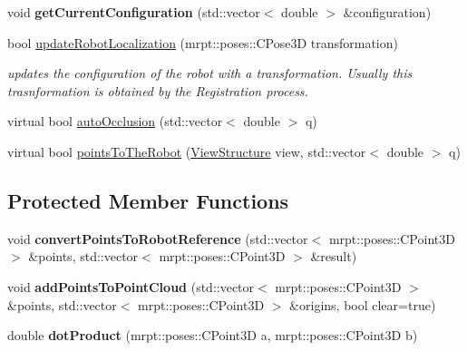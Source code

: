 \begin{DoxyCompactItemize}
\item 
void {\bfseries get\+Current\+Configuration} (std\+::vector$<$ double $>$ \&configuration)\hypertarget{classRobotSensor_a4b7a23f169416d68ca709305bab109c9}{}\label{classRobotSensor_a4b7a23f169416d68ca709305bab109c9}

\item 
bool \hyperlink{classRobotSensor_a8cfdb150fb9a8add2df06009c258e139}{update\+Robot\+Localization} (mrpt\+::poses\+::\+C\+Pose3D transformation)\hypertarget{classRobotSensor_a8cfdb150fb9a8add2df06009c258e139}{}\label{classRobotSensor_a8cfdb150fb9a8add2df06009c258e139}

\begin{DoxyCompactList}\small\item\em updates the configuration of the robot with a transformation. Usually this trasnformation is obtained by the Registration process. \end{DoxyCompactList}\item 
virtual bool \hyperlink{classRobotSensor_a8e1c363f54f6e5a00499b93fd245a3da}{auto\+Occlusion} (std\+::vector$<$ double $>$ q)
\item 
virtual bool \hyperlink{classRobotSensor_a720b3046a49b028d07090c1c79cd0a96}{points\+To\+The\+Robot} (\hyperlink{classViewStructure}{View\+Structure} view, std\+::vector$<$ double $>$ q)
\end{DoxyCompactItemize}
\subsection*{Protected Member Functions}
\begin{DoxyCompactItemize}
\item 
void {\bfseries convert\+Points\+To\+Robot\+Reference} (std\+::vector$<$ mrpt\+::poses\+::\+C\+Point3D $>$ \&points, std\+::vector$<$ mrpt\+::poses\+::\+C\+Point3D $>$ \&result)\hypertarget{classRobotSensor_a5c36e17b54e0f4c06cd3b47e8976c924}{}\label{classRobotSensor_a5c36e17b54e0f4c06cd3b47e8976c924}

\item 
void {\bfseries add\+Points\+To\+Point\+Cloud} (std\+::vector$<$ mrpt\+::poses\+::\+C\+Point3D $>$ \&points, std\+::vector$<$ mrpt\+::poses\+::\+C\+Point3D $>$ \&origins, bool clear=true)\hypertarget{classRobotSensor_a317e3af77772a792ac4672f0461d2da8}{}\label{classRobotSensor_a317e3af77772a792ac4672f0461d2da8}

\item 
double {\bfseries dot\+Product} (mrpt\+::poses\+::\+C\+Point3D a, mrpt\+::poses\+::\+C\+Point3D b)\hypertarget{classRobotSensor_a548c1dd9588bad4f1a3d8a4aa96c7fbe}{}\label{classRobotSensor_a548c1dd9588bad4f1a3d8a4aa96c7fbe}

\end{DoxyCompactItemize}
